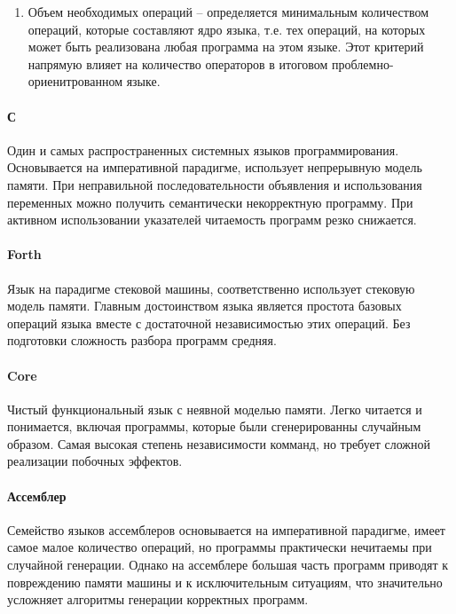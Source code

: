 \documentclass[russian,utf8,emptystyle]{eskdtext}
\begin{document}
\begin{spacing}{1.5}
\begin{enumerate}
\item Объем необходимых операций -- определяется минимальным количеством операций, которые составляют ядро языка, т.е. тех операций, на которых может быть реализована любая программа на этом языке. Этот критерий напрямую влияет на количество операторов в итоговом проблемно-ориенитрованном языке.
\end{enumerate}

\paragraph{С} 

Один и самых распространенных системных языков программирования. Основывается на императивной парадигме, использует непрерывную модель памяти. При неправильной последовательности объявления и использования переменных можно получить семантически некорректную программу. При активном использовании указателей читаемость программ резко снижается.

\paragraph{Forth} 

Язык на парадигме стековой машины, соответственно использует стековую модель памяти. Главным достоинством языка является простота базовых операций языка вместе с достаточной независимостью этих операций. Без подготовки сложность разбора программ средняя.

\paragraph{Core}

Чистый функциональный язык с неявной моделью памяти. Легко читается и понимается, включая программы, которые были сгенерированны случайным образом. Самая высокая степень независимости комманд, но требует сложной реализации побочных эффектов.

\paragraph{Ассемблер}


Семейство языков ассемблеров основывается на императивной парадигме, имеет самое малое количество операций, но программы практически нечитаемы при случайной генерации. Однако на ассемблере большая часть программ приводят к повреждению памяти машины и к исключительным ситуациям, что значительно усложняет алгоритмы генерации корректных программ.


\end{spacing}
\end{document}
